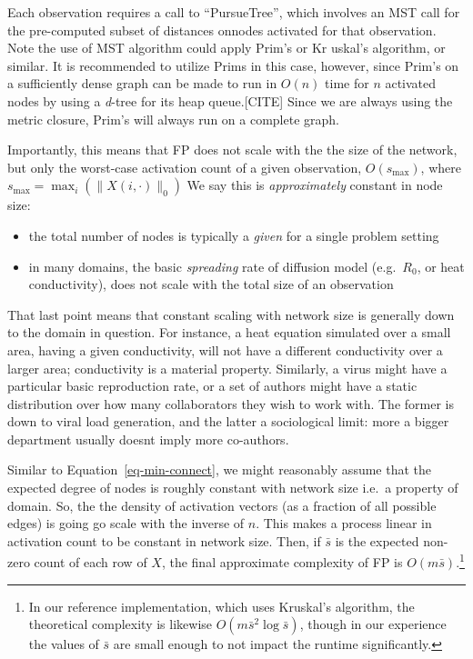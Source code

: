 \documentclass[%
	12pt,
		oneside,
		letterpaper
]{book}
\providecommand{\tightlist}{%
  \setlength{\itemsep}{0pt}\setlength{\parskip}{0pt}}\usepackage{longtable,booktabs,array}
\begin{document}
Each observation requires a call to ``PursueTree'', which involves an
MST call for the pre-computed subset of distances onnodes activated for
that observation. Note the use of MST algorithm could apply Prim's or Kr
uskal's algorithm, or similar. It is recommended to utilize Prims in
this case, however, since Prim's on a sufficiently dense graph can be
made to run in \(O(n)\) time for \(n\) activated nodes by using a
\emph{d}-tree for its heap queue.{[}CITE{]} Since we are always using
the metric closure, Prim's will always run on a complete graph.

Importantly, this means that FP does not scale with the the size of the
network, but only the worst-case activation count of a given
observation, \(O(s_{\text{max}})\), where
\(s_{\text{max}}=\max_i{(\|X(i,\cdot)\|_0)}\) We say this is
\emph{approximately} constant in node size:

\begin{itemize}
\tightlist
\item
  the total number of nodes is typically a \emph{given} for a single
  problem setting
\item
  in many domains, the basic \emph{spreading} rate of diffusion model
  (e.g.~\(R_0\), or heat conductivity), does not scale with the total
  size of an observation
\end{itemize}

That last point means that constant scaling with network size is
generally down to the domain in question. For instance, a heat equation
simulated over a small area, having a given conductivity, will not have
a different conductivity over a larger area; conductivity is a material
property. Similarly, a virus might have a particular basic reproduction
rate, or a set of authors might have a static distribution over how many
collaborators they wish to work with. The former is down to viral load
generation, and the latter a sociological limit: more a bigger
department usually doesnt imply more co-authors.

Similar to Equation~\ref{eq-min-connect}, we might reasonably assume
that the expected degree of nodes is roughly constant with network size
i.e.~a property of domain. So, the the density of activation vectors (as
a fraction of all possible edges) is going go scale with the inverse of
\(n\). This makes a process linear in activation count to be constant in
network size. Then, if \(\bar{s}\) is the expected non-zero count of
each row of \(X\), the final approximate complexity of FP is
\(O(m\bar{s})\).\footnote{ In our reference implementation, which uses
  Kruskal's algorithm, the theoretical complexity is likewise
  \(O(m\bar{s}^2\log{\bar{s}})\), though in our experience the values of
  \(\bar{s}\) are small enough to not impact the runtime significantly.}
\end{document}
